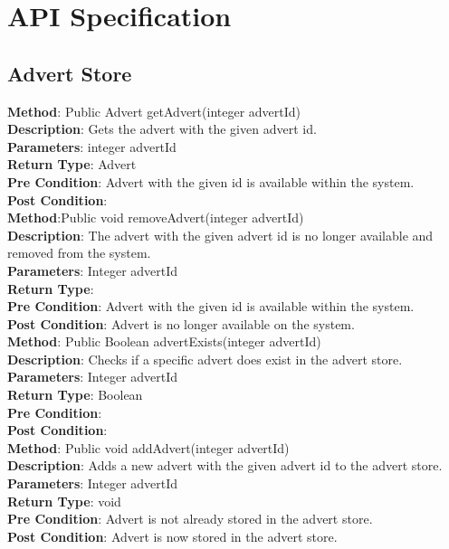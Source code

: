 \documentclass{l3deliverable}
\begin{document}

\section{API Specification}


\subsection{Advert Store}

\textbf{Method}: Public Advert getAdvert(integer advertId)\\
\textbf{Description}: Gets the advert with the given advert id.\\
\textbf{Parameters}: integer advertId\\
\textbf{Return Type}: Advert\\
\textbf{Pre Condition}: Advert with the given id is available within the system. \\
\textbf{Post Condition}: \\

\textbf{Method}:Public void removeAdvert(integer advertId)\\
\textbf{Description}: The advert with the given advert id is no longer available and removed from the system.\\
\textbf{Parameters}: Integer advertId\\
\textbf{Return Type}: \\
\textbf{Pre Condition}: Advert with the given id is available within the system.\\
\textbf{Post Condition}: Advert is no longer available on the system.\\

\textbf{Method}: Public Boolean advertExists(integer advertId)\\
\textbf{Description}: Checks if a specific advert does exist in the advert store.\\
\textbf{Parameters}: Integer advertId\\
\textbf{Return Type}: Boolean\\
\textbf{Pre Condition}:\\
\textbf{Post Condition}:\\

\textbf{Method}: Public void addAdvert(integer advertId)\\
\textbf{Description}: Adds a new advert with the given advert id to the advert store. \\
\textbf{Parameters}: Integer advertId\\
\textbf{Return Type}: void\\
\textbf{Pre Condition}: Advert is not already stored in the advert store.\\
\textbf{Post Condition}: Advert is now stored in the advert store.\\
\end{document}
